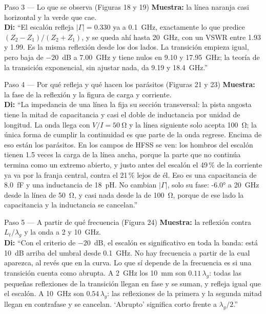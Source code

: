 \documentclass[11pt,letterpaper]{article}
\begin{document}
\begin{paso}{Paso 3 --- Lo que se observa (Figuras 18 y 19)}
\textbf{Muestra:} la línea naranja casi horizontal y la verde que cae.\\
\textbf{Di:} ``El escalón refleja $|\Gamma|=0.330$ ya a \SI{0.1}{GHz}, exactamente lo que predice $(Z_2-Z_1)/(Z_2+Z_1)$, y se queda ahí hasta \SI{20}{GHz}, con un VSWR entre 1.93 y 1.99. Es la misma reflexión desde los dos lados. La transición empieza igual, pero baja de $-20$~dB a \SI{7.00}{GHz} y tiene nulos en \SI{9.10}{} y \SI{17.95}{GHz}; la teoría de la transición exponencial, sin ajustar nada, da \SI{9.19}{} y \SI{18.4}{GHz}.''
\end{paso}

\begin{paso}{Paso 4 --- Por qué refleja y qué hacen los parásitos (Figuras 21 y 23)}
\textbf{Muestra:} la fase de la reflexión y la figura de carga y corriente.\\
\textbf{Di:} ``La impedancia de una línea la fija su sección transversal: la pista angosta tiene la mitad de capacitancia y casi el doble de inductancia por unidad de longitud. La onda llega con $V/I=\SI{50}{\ohm}$ y la línea siguiente solo acepta \SI{100}{\ohm}; la única forma de cumplir la continuidad es que parte de la onda regrese. Encima de eso están los parásitos. En los campos de HFSS se ven: los hombros del escalón tienen 1.5 veces la carga de la línea ancha, porque la parte que no continúa termina como un extremo abierto, y justo antes del escalón el 49\,\% de la corriente ya va por la franja central, contra el 21\,\% lejos de él. Eso es una capacitancia de \SI{8.0}{fF} y una inductancia de \SI{18}{pH}. No cambian $|\Gamma|$, solo su fase: \ang{-6.0} a \SI{20}{GHz} desde la línea de \SI{50}{\ohm}, y casi nada desde la de \SI{100}{\ohm}, porque de ese lado la capacitancia y la inductancia se cancelan.''
\end{paso}

\begin{paso}{Paso 5 --- A partir de qué frecuencia (Figura 24)}
\textbf{Muestra:} la reflexión contra $L_t/\lambda_g$ y la onda a 2 y \SI{10}{GHz}.\\
\textbf{Di:} ``Con el criterio de $-20$~dB, el escalón es significativo en toda la banda: está 10~dB arriba del umbral desde \SI{0.1}{GHz}. No hay frecuencia a partir de la cual aparezca, al revés que en la curva. Lo que sí depende de la frecuencia es si una transición cuenta como abrupta. A \SI{2}{GHz} los \SI{10}{mm} son $0.11\,\lambda_g$: todas las pequeñas reflexiones de la transición llegan en fase y se suman, y refleja igual que el escalón. A \SI{10}{GHz} son $0.54\,\lambda_g$: las reflexiones de la primera y la segunda mitad llegan en contrafase y se cancelan. `Abrupto' significa corto frente a $\lambda_g/2$.''
\end{paso}
\end{document}
